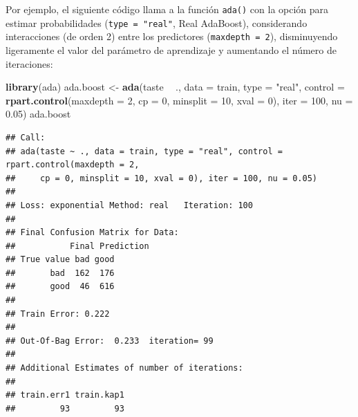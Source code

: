 \documentclass[
]{book}
\newenvironment{Shaded}{\begin{snugshade}}{\end{snugshade}}
\newcommand{\CommentTok}[1]{\textcolor[rgb]{0.56,0.35,0.01}{\textit{#1}}}
\newcommand{\DataTypeTok}[1]{\textcolor[rgb]{0.13,0.29,0.53}{#1}}
\newcommand{\DecValTok}[1]{\textcolor[rgb]{0.00,0.00,0.81}{#1}}
\newcommand{\FloatTok}[1]{\textcolor[rgb]{0.00,0.00,0.81}{#1}}
\newcommand{\KeywordTok}[1]{\textcolor[rgb]{0.13,0.29,0.53}{\textbf{#1}}}
\newcommand{\NormalTok}[1]{#1}
\newcommand{\OperatorTok}[1]{\textcolor[rgb]{0.81,0.36,0.00}{\textbf{#1}}}
\newcommand{\StringTok}[1]{\textcolor[rgb]{0.31,0.60,0.02}{#1}}
\theoremstyle{break}
\theoremstyle{definition}
\theoremstyle{definition}
\theoremstyle{definition}
\theoremstyle{remark}
\begin{document}
\begin{Shaded}
\end{Shaded}

Por ejemplo, el siguiente código llama a la función \texttt{ada()} con la opción para estimar probabilidades (\texttt{type\ =\ "real"}, Real AdaBoost), considerando interacciones (de orden 2) entre los predictores (\texttt{maxdepth\ =\ 2}), disminuyendo ligeramente el valor del parámetro de aprendizaje y aumentando el número de iteraciones:

\begin{Shaded}
\begin{Highlighting}[]
\KeywordTok{library}\NormalTok{(ada)}
\NormalTok{ada.boost <-}\StringTok{ }\KeywordTok{ada}\NormalTok{(taste }\OperatorTok{~}\StringTok{ }\NormalTok{., }\DataTypeTok{data =}\NormalTok{ train, }\DataTypeTok{type =} \StringTok{"real"}\NormalTok{,}
             \DataTypeTok{control =} \KeywordTok{rpart.control}\NormalTok{(}\DataTypeTok{maxdepth =} \DecValTok{2}\NormalTok{, }\DataTypeTok{cp =} \DecValTok{0}\NormalTok{, }\DataTypeTok{minsplit =} \DecValTok{10}\NormalTok{, }\DataTypeTok{xval =} \DecValTok{0}\NormalTok{),}
             \DataTypeTok{iter =} \DecValTok{100}\NormalTok{, }\DataTypeTok{nu =} \FloatTok{0.05}\NormalTok{)}
\NormalTok{ada.boost}
\end{Highlighting}
\end{Shaded}

\begin{verbatim}
## Call:
## ada(taste ~ ., data = train, type = "real", control = rpart.control(maxdepth = 2, 
##     cp = 0, minsplit = 10, xval = 0), iter = 100, nu = 0.05)
## 
## Loss: exponential Method: real   Iteration: 100 
## 
## Final Confusion Matrix for Data:
##           Final Prediction
## True value bad good
##       bad  162  176
##       good  46  616
## 
## Train Error: 0.222 
## 
## Out-Of-Bag Error:  0.233  iteration= 99 
## 
## Additional Estimates of number of iterations:
## 
## train.err1 train.kap1 
##         93         93
\end{verbatim}
\end{document}
